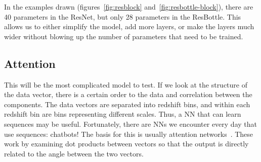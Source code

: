 In the examples drawn (figures~\ref{fig:resblock} and~\ref{fig:resbottle-block}), there are 40 parameters in the ResNet, but only 28 parameters in the ResBottle. This allows us to either simplify the model, add more layers, or make the layers much wider without blowing up the number of parameters that need to be trained.
\subsection{Attention}
This will be the most complicated model to test. If we look at the structure of the data vector, there is a certain order to the data and correlation between the components. The data vectors are separated into redshift bins, and within each redshift bin are bins representing different scales. Thus, a NN that can learn sequences may be useful. Fortunately, there are NNs we encounter every day that use sequences: chatbots! The basis for this is usually attention networks~\cite{vaswani_attention_2017}. These work by examining dot products between vectors so that the output is directly related to the angle between the two vectors.

